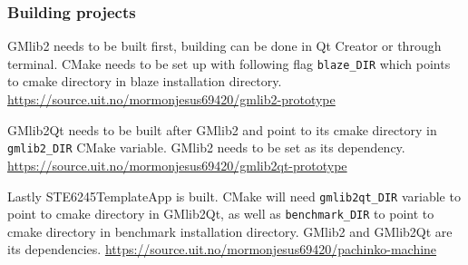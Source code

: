 \documentclass[a4,10pt]{article}
\begin{document}
\subsubsection{Building projects}
GMlib2 needs to be built first, building can be done in Qt Creator or through terminal. CMake needs to be set up with following flag \verb|blaze_DIR| which points to cmake directory in blaze installation directory. \url{https://source.uit.no/mormonjesus69420/gmlib2-prototype}

GMlib2Qt needs to be built after GMlib2 and point to its cmake directory in \verb|gmlib2_DIR| CMake variable. GMlib2 needs to be set as its dependency.  \url{https://source.uit.no/mormonjesus69420/gmlib2qt-prototype}

Lastly STE6245TemplateApp is built. CMake will need \verb|gmlib2qt_DIR| variable to point to cmake directory in GMlib2Qt, as well as \verb|benchmark_DIR| to point to cmake directory in benchmark installation directory. GMlib2 and GMlib2Qt are its dependencies.  \url{https://source.uit.no/mormonjesus69420/pachinko-machine}
\end{document}

